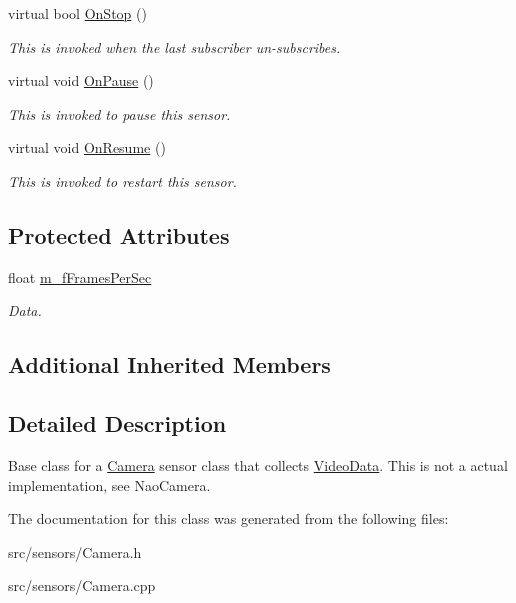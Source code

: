 \begin{DoxyCompactItemize}
\mbox{\label{class_camera_af42a31534de2673e62f4b000d96ddd4c}} 
virtual bool \hyperlink{class_camera_af42a31534de2673e62f4b000d96ddd4c}{On\+Stop} ()
\begin{DoxyCompactList}\small\item\em This is invoked when the last subscriber un-\/subscribes. \end{DoxyCompactList}\item 
\mbox{\label{class_camera_aecd7262c9ddd921cd7d6223ee84586ae}} 
virtual void \hyperlink{class_camera_aecd7262c9ddd921cd7d6223ee84586ae}{On\+Pause} ()
\begin{DoxyCompactList}\small\item\em This is invoked to pause this sensor. \end{DoxyCompactList}\item 
\mbox{\label{class_camera_afb0a4e93bb0bb354d3fa3e5b5631a247}} 
virtual void \hyperlink{class_camera_afb0a4e93bb0bb354d3fa3e5b5631a247}{On\+Resume} ()
\begin{DoxyCompactList}\small\item\em This is invoked to restart this sensor. \end{DoxyCompactList}\end{DoxyCompactItemize}
\subsection*{Protected Attributes}
\begin{DoxyCompactItemize}
\item 
\mbox{\label{class_camera_aa5bca0acb4af13119c6d5c498dafd59d}} 
float \hyperlink{class_camera_aa5bca0acb4af13119c6d5c498dafd59d}{m\+\_\+f\+Frames\+Per\+Sec}
\begin{DoxyCompactList}\small\item\em Data. \end{DoxyCompactList}\end{DoxyCompactItemize}
\subsection*{Additional Inherited Members}


\subsection{Detailed Description}
Base class for a \hyperlink{class_camera}{Camera} sensor class that collects \hyperlink{class_video_data}{Video\+Data}. This is not a actual implementation, see Nao\+Camera. 

The documentation for this class was generated from the following files\+:\begin{DoxyCompactItemize}
\item 
src/sensors/Camera.\+h\item 
src/sensors/Camera.\+cpp\end{DoxyCompactItemize}
